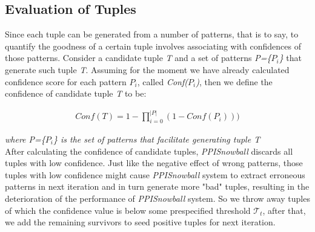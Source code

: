 \subsection{Evaluation of Tuples}
\label{EvalTuples}


Since each tuple can be generated from a number of patterns, that is to say, to quantify the goodness of a certain tuple involves associating with confidences of those patterns. Consider a candidate tuple \emph{T} and a set of patterns \emph{P=\{$P_{i}$\}} that generate such tuple \emph{T}. Assuming for the moment we have already calculated confidence score for each pattern $P_{i}$, called \emph{Conf($P_{i}$)}, then we define the confidence of candidate tuple \emph{T} to be:

\begin{equation}
\begin{aligned}
Conf(T)=1-\prod_{i=0}^{|P|}(1-Conf(P_{i})))
\end{aligned}
\end{equation}

\emph{where P=\{$P_{i}$\} is the set of patterns that facilitate generating tuple \emph{T}}\\


After calculating the confidence of candidate tuples, \emph{PPISnowball} discards all tuples with low confidence. Just like the negative effect of wrong patterns, those tuples with low confidence might cause \emph{PPISnowball} system to extract erroneous patterns in next iteration and in turn generate more "bad" tuples, resulting in the deterioration of the performance of \emph{PPISnowball} system. So we throw away tuples of which the confidence value is below some prespecified threshold $\mathcal {T}_{t}$, after that, we add the remaining survivors to seed positive tuples for next iteration.
